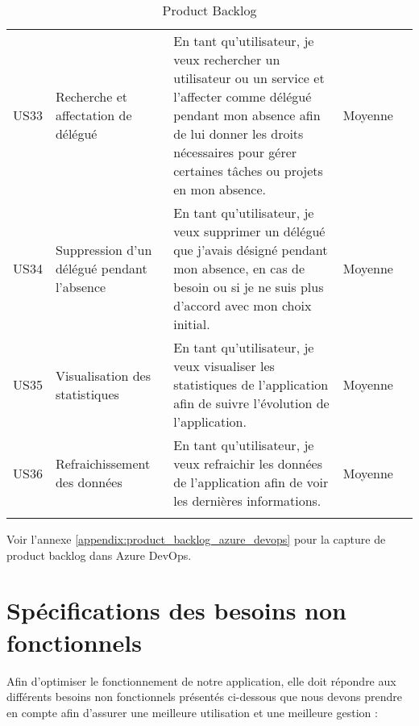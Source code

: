 \begin{landscape}
\begin{adjustwidth}{-1cm}{}
\begin{longtable}{|c|p{5cm}|p{12cm}|c|c|}
    \cline{1-4}
    US33&Recherche et affectation de délégué&En tant qu'utilisateur, je veux rechercher un utilisateur ou un service et l'affecter comme délégué pendant mon absence afin de lui donner les droits nécessaires pour gérer certaines tâches ou projets en mon absence.&Moyenne& \\
    \cline{1-4}
    US34&Suppression d'un délégué pendant l'absence&En tant qu'utilisateur, je veux supprimer un délégué que j'avais désigné pendant mon absence, en cas de besoin ou si je ne suis plus d'accord avec mon choix initial.&Moyenne&\\

    \cline{1-4}
    US35&Visualisation des statistiques&En tant qu'utilisateur, je veux visualiser les statistiques de l'application afin de suivre l'évolution de l'application.&Moyenne&\\
    
    \cline{1-4}
    US36&Refraichissement des données&En tant qu'utilisateur, je veux refraichir les données de l'application afin de voir les dernières informations.&Moyenne&\\


    \hline
        \caption{Product Backlog}
        \label{tab:product_backlog}
      
      \end{longtable}
    \end{adjustwidth}
\end{landscape}

Voir l'annexe \ref{appendix:product_backlog_azure_devops} pour la capture de product backlog dans Azure DevOps.

\section{Spécifications des besoins non fonctionnels}
Afin d'optimiser le fonctionnement de notre application, elle doit répondre aux différents besoins non fonctionnels présentés ci-dessous que nous devons prendre en compte afin d'assurer une meilleure utilisation et une meilleure gestion :

